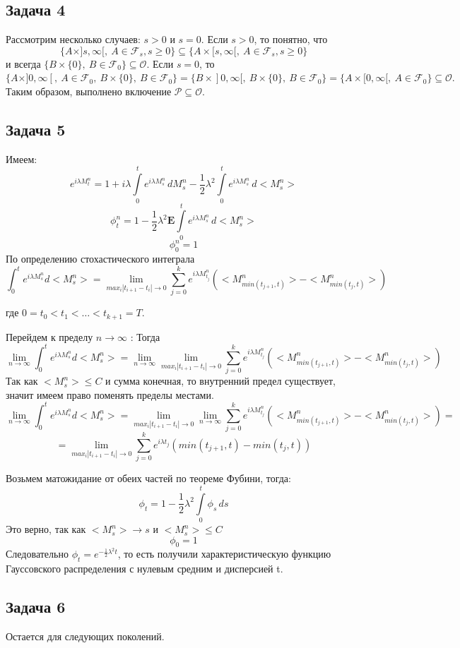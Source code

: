 \documentclass[12pt]{article}
\newcommand\cF{{\mathcal F}}
\newcommand\cO{{\mathcal O}}
\newcommand\cP{{\mathcal P}}
\begin{document}
\subsection{Задача 4}
Рассмотрим несколько случаев: $s>0$ и $s=0$.
Если $s>0$, то понятно, что 
\[\{A\times ]s,\infty[, \ A\in \cF_s, s\ge 0\}\subseteq\{A\times [s,\infty[, \ A\in \cF_s, s\ge 0\}\] и всегда $\{B\times \{0\},\ B\in\cF_0\}\subseteq\cO.$
Если $s=0$, то $\{A\times ]0,\infty[, \ A\in \cF_0,\ B\times \{0\},\ B\in\cF_0\}=\{ B\times ]0,\infty[, \ B\times \{0\},\ B\in\cF_0\}=\{A\times [0,\infty[, \ A\in \cF_0\}\subseteq\cO.$
Таким образом, выполнено включение
$\cP \subseteq\cO $.

\subsection{Задача 5}
Имеем:
\[
e^{i \lambda M_t^n}=1+i \lambda \int\limits_0^t e^{i \lambda M_s^n} \, dM_s^n - \frac12 \lambda^2 \int\limits_0^t e^{i \lambda M_s^n} \, d <M_s^n>
\]
\[
\phi _t^n=1-\frac12 \lambda^2 \textbf {E} \int\limits_0^t e^{i \lambda M_s^n} \, d <M_s^n>
\]
\[\phi_0^n=1\]
По определению стохастического интеграла
\[\int_0^t e^{i \lambda M_s^n} d<M_s^n> = \lim_{max_i |t_{i+1} - t_i| \to 0} \sum_{j=0}^k e^{i \lambda M_{t_j}^n} (<M_{min(t_{j + 1}, t)}^n> - <M_{min(t_{j}, t)}^n>) \]

где $0 = t_0 < t_1 < \ldots <  t_{k+1} = T$.

Перейдем к пределу $n \to \infty $ : 
Тогда 
\[\lim_{n \to \infty}\int_0^t e^{i \lambda M_s^n} d<M_s^n> =\lim_{n \to \infty} \lim_{max_i |t_{i+1} - t_i| \to 0} \sum_{j=0}^k e^{i \lambda M_{t_j}^n} (<M_{min(t_{j + 1}, t)}^n> - <M_{min(t_{j}, t)}^n>) \]
Так как $ <M_s^n>\leqslant C$ и сумма конечная, то внутренний предел существует, значит имеем право поменять пределы местами.
\[\lim_{n \to \infty}\int_0^t e^{i \lambda M_s^n} d<M_s^n> = \lim_{max_i |t_{i+1} - t_i| \to 0} \lim_{n \to \infty} \sum_{j=0}^k e^{i \lambda M_{t_j}^n} (<M_{min(t_{j + 1}, t)}^n> - <M_{min(t_{j}, t)}^n>) = \]
\[= \lim_{max_i |t_{i+1} - t_i| \to 0} \sum_{j=0}^k e^{i \lambda t_j} (min(t_{j + 1}, t) - min(t_{j}, t)) \]

Возьмем матожидание от обеих частей по теореме Фубини, тогда:
\[ \phi_t=1-\frac12 \lambda^2 \int\limits_0^t \phi_s \,ds \]
Это верно, так как $<M_s^n> \to s $ и $ <M_s^n>\leqslant C$
\[\phi_0=1\]
Следовательно $ \phi_t=e^{-\frac12 \lambda^2 t} $, то есть получили характеристическую функцию Гауссовского распределения с нулевым
средним и дисперсией t.
\subsection{Задача 6}
Остается для следующих поколений.
\end{document}
